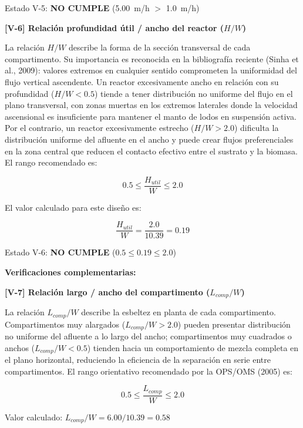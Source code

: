 \documentclass[12pt,a4paper]{article}
\begin{document}
Estado V-5: \textbf{NO CUMPLE} (5.00~m/h $>$ 1.0~m/h)

\textbf{[V-6] Relación profundidad útil / ancho del reactor ($H/W$)}

La relación $H/W$ describe la forma de la sección transversal de cada compartimento. Su importancia es reconocida en la bibliografía reciente (Sinha et al., 2009): valores extremos en cualquier sentido comprometen la uniformidad del flujo vertical ascendente. Un reactor excesivamente ancho en relación con su profundidad ($H/W < 0.5$) tiende a tener distribución no uniforme del flujo en el plano transversal, con zonas muertas en los extremos laterales donde la velocidad ascensional es insuficiente para mantener el manto de lodos en suspensión activa. Por el contrario, un reactor excesivamente estrecho ($H/W > 2.0$) dificulta la distribución uniforme del afluente en el ancho y puede crear flujos preferenciales en la zona central que reducen el contacto efectivo entre el sustrato y la biomasa. El rango recomendado es:

\begin{equation}
0.5 \leq \frac{H_{util}}{W} \leq 2.0
\end{equation}

El valor calculado para este diseño es:

\begin{equation}
\frac{H_{util}}{W} = \frac{2.0}{10.39} = 0.19
\end{equation}

Estado V-6: \textbf{NO CUMPLE} ($0.5 \leq 0.19 \leq 2.0$)

\textbf{Verificaciones complementarias:}

\textbf{[V-7] Relación largo / ancho del compartimento ($L_{comp} / W$)}

La relación $L_{comp} / W$ describe la esbeltez en planta de cada compartimento. Compartimentos muy alargados ($L_{comp} / W > 2.0$) pueden presentar distribución no uniforme del afluente a lo largo del ancho; compartimentos muy cuadrados o anchos ($L_{comp} / W < 0.5$) tienden hacia un comportamiento de mezcla completa en el plano horizontal, reduciendo la eficiencia de la separación en serie entre compartimentos. El rango orientativo recomendado por la OPS/OMS (2005) es:

\begin{equation}
0.5 \leq \frac{L_{comp}}{W} \leq 2.0
\end{equation}

Valor calculado: $L_{comp} / W = 6.00 / 10.39 = 0.58$
\end{document}
